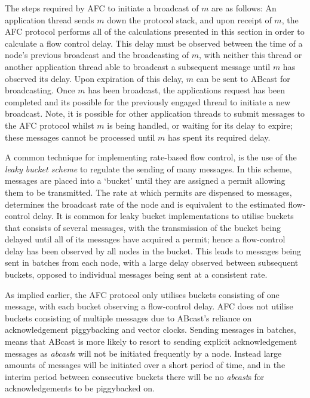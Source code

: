      The steps required by AFC to initiate a broadcast of $m$ are as follows: An application thread sends $m$ down the protocol stack, and upon receipt of $m$, the AFC protocol performs all of the calculations presented in this section in order to calculate a flow control delay.  This delay must be observed between the time of a node's previous broadcast and the broadcasting of $m$, with neither this thread or another application thread able to broadcast a subsequent message until $m$ has observed its delay.  Upon expiration of this delay, $m$ can be sent to \textsf{ABcast} for broadcasting.  Once $m$ has been broadcast, the applications request has been completed and its possible for the previously engaged thread to initiate a new broadcast.  Note, it is possible for other application threads to submit messages to the AFC protocol whilst $m$ is being handled, or waiting for its delay to expire; these messages cannot be processed until $m$ has spent its required delay. 
        
    A common technique for implementing rate-based flow control, is the use of the \emph{leaky bucket scheme} \citep{Jain:1996:CCT:244118.244120, bertsekas1992DataNetworksFC} to regulate the sending of many messages.  In this scheme, messages are placed into a \textquoteleft{}bucket' until they are assigned a permit allowing them to be transmitted.  The rate at which permits are dispensed to messages, determines the broadcast rate of the node and is equivalent to the estimated flow-control delay.  It is common for  leaky bucket implementations to utilise buckets that consists of several messages, with the transmission of the bucket being delayed until all of its messages have acquired a permit; hence a flow-control delay has been observed by all nodes in the bucket.  This leads to messages being sent in batches from each node, with a large delay observed between subsequent buckets, opposed to individual messages being sent at a consistent rate.  
    
    As implied earlier, the AFC protocol only utilises buckets consisting of one message, with each bucket observing a flow-control delay.  AFC does not utilise buckets consisting of multiple messages due to \textsf{ABcast}'s reliance on acknowledgement piggybacking and vector clocks.  Sending messages in batches, means that \textsf{ABcast} is more likely to resort to sending explicit acknowledgement messages as \emph{abcast}s will not be initiated frequently by a node.  Instead large amounts of messages will be initiated over a short period of time, and in the interim period between consecutive buckets there will be no \emph{abcast}s for acknowledgements to be piggybacked on.  
    
